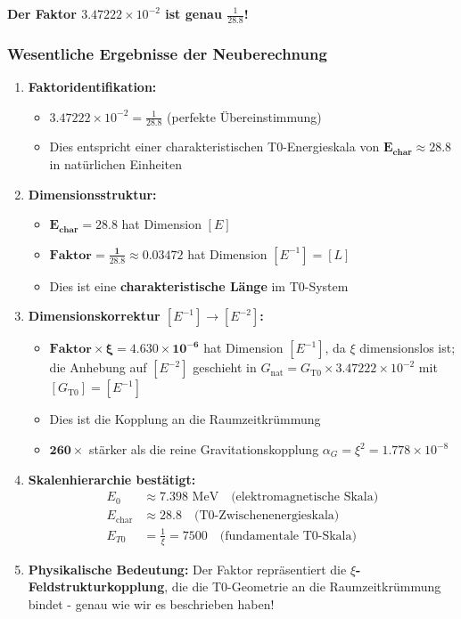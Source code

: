 	\textbf{Der Faktor $3.47222 \times 10^{-2}$ ist genau $\frac{1}{28.8}$!}
	
	\subsubsection{Wesentliche Ergebnisse der Neuberechnung}
	
	\begin{enumerate}
		\item \textbf{Faktoridentifikation:}
		\begin{itemize}
			\item $3.47222 \times 10^{-2} = \frac{1}{28.8}$ (perfekte Übereinstimmung)
			\item Dies entspricht einer charakteristischen T0-Energieskala von $\mathbf{E_{\text{char}} \approx 28.8}$ in natürlichen Einheiten
		\end{itemize}
		
		\item \textbf{Dimensionsstruktur:}
		\begin{itemize}
			\item $\mathbf{E_{\text{char}} = 28.8}$ hat Dimension $[E]$
			\item $\mathbf{\text{Faktor} = \frac{1}{28.8} \approx 0.03472}$ hat Dimension $[E^{-1}] = [L]$
			\item Dies ist eine \textbf{charakteristische Länge} im T0-System
		\end{itemize}
		
		\item \textbf{Dimensionskorrektur $[E^{-1}] \rightarrow [E^{-2}]$:}
		\begin{itemize}
			\item $\symbf{\text{Faktor} \times \xi = 4.630 \times 10^{-6}}$ hat Dimension $[E^{-1}]$, da $\xi$ dimensionslos ist; die Anhebung auf $[E^{-2}]$ geschieht in $G_{\text{nat}} = G_{\text{T0}} \times 3.47222 \times 10^{-2}$ mit $[G_{\text{T0}}] = [E^{-1}]$
			\item Dies ist die Kopplung an die Raumzeitkrümmung
			\item $\mathbf{260\times}$ stärker als die reine Gravitationskopplung $\alpha_G = \xi^2 = 1.778 \times 10^{-8}$
		\end{itemize}
		
		\item \textbf{Skalenhierarchie bestätigt:}
		\begin{align}
			E_0 &\approx 7.398 \text{ MeV} \quad \text{(elektromagnetische Skala)} \\
			E_{\text{char}} &\approx 28.8 \quad \text{(T0-Zwischenenergieskala)} \\
			E_{T0} &= \frac{1}{\xi} = 7500 \quad \text{(fundamentale T0-Skala)}
		\end{align}
		
		\item \textbf{Physikalische Bedeutung:}
		Der Faktor repräsentiert die \textbf{$\xi$-Feldstrukturkopplung}, die die T0-Geometrie an die Raumzeitkrümmung bindet - genau wie wir es beschrieben haben!
	\end{enumerate}
	

